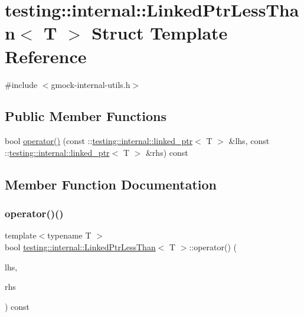 \hypertarget{structtesting_1_1internal_1_1_linked_ptr_less_than}{}\section{testing\+::internal\+::Linked\+Ptr\+Less\+Than$<$ T $>$ Struct Template Reference}
\label{structtesting_1_1internal_1_1_linked_ptr_less_than}


{\ttfamily \#include $<$gmock-\/internal-\/utils.\+h$>$}

\subsection*{Public Member Functions}
\begin{DoxyCompactItemize}
\item 
bool \mbox{\hyperlink{structtesting_1_1internal_1_1_linked_ptr_less_than_a0614293c43e51b280a870ab117355164}{operator()}} (const \+::\mbox{\hyperlink{classtesting_1_1internal_1_1linked__ptr}{testing\+::internal\+::linked\+\_\+ptr}}$<$ T $>$ \&lhs, const \+::\mbox{\hyperlink{classtesting_1_1internal_1_1linked__ptr}{testing\+::internal\+::linked\+\_\+ptr}}$<$ T $>$ \&rhs) const
\end{DoxyCompactItemize}


\subsection{Member Function Documentation}
\mbox{\label{structtesting_1_1internal_1_1_linked_ptr_less_than_a0614293c43e51b280a870ab117355164}} 
\subsubsection{\texorpdfstring{operator()()}{operator()()}}
{\footnotesize\ttfamily template$<$typename T $>$ \\
bool \mbox{\hyperlink{structtesting_1_1internal_1_1_linked_ptr_less_than}{testing\+::internal\+::\+Linked\+Ptr\+Less\+Than}}$<$ T $>$\+::operator() (\begin{DoxyParamCaption}\item[{const \+::\mbox{\hyperlink{classtesting_1_1internal_1_1linked__ptr}{testing\+::internal\+::linked\+\_\+ptr}}$<$ T $>$ \&}]{lhs,  }\item[{const \+::\mbox{\hyperlink{classtesting_1_1internal_1_1linked__ptr}{testing\+::internal\+::linked\+\_\+ptr}}$<$ T $>$ \&}]{rhs }\end{DoxyParamCaption}) const\hspace{0.3cm}{\ttfamily [inline]}}



